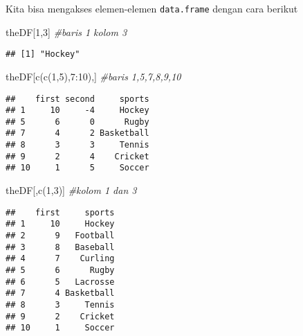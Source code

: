\documentclass[
]{book}
\newenvironment{Shaded}{\begin{snugshade}}{\end{snugshade}}
\newcommand{\CommentTok}[1]{\textcolor[rgb]{0.56,0.35,0.01}{\textit{#1}}}
\newcommand{\DecValTok}[1]{\textcolor[rgb]{0.00,0.00,0.81}{#1}}
\newcommand{\FunctionTok}[1]{\textcolor[rgb]{0.00,0.00,0.00}{#1}}
\newcommand{\NormalTok}[1]{#1}
\newcommand{\SpecialCharTok}[1]{\textcolor[rgb]{0.00,0.00,0.00}{#1}}
\begin{document}
Kita bisa mengakses elemen-elemen \texttt{data.frame} dengan cara berikut

\begin{Shaded}
\begin{Highlighting}[]
\NormalTok{theDF[}\DecValTok{1}\NormalTok{,}\DecValTok{3}\NormalTok{] }\CommentTok{\#baris 1 kolom 3}
\end{Highlighting}
\end{Shaded}

\begin{verbatim}
## [1] "Hockey"
\end{verbatim}

\begin{Shaded}
\begin{Highlighting}[]
\NormalTok{theDF[}\FunctionTok{c}\NormalTok{(}\FunctionTok{c}\NormalTok{(}\DecValTok{1}\NormalTok{,}\DecValTok{5}\NormalTok{),}\DecValTok{7}\SpecialCharTok{:}\DecValTok{10}\NormalTok{),] }\CommentTok{\#baris 1,5,7,8,9,10}
\end{Highlighting}
\end{Shaded}

\begin{verbatim}
##    first second     sports
## 1     10     -4     Hockey
## 5      6      0      Rugby
## 7      4      2 Basketball
## 8      3      3     Tennis
## 9      2      4    Cricket
## 10     1      5     Soccer
\end{verbatim}

\begin{Shaded}
\begin{Highlighting}[]
\NormalTok{theDF[,}\FunctionTok{c}\NormalTok{(}\DecValTok{1}\NormalTok{,}\DecValTok{3}\NormalTok{)] }\CommentTok{\#kolom 1 dan 3}
\end{Highlighting}
\end{Shaded}

\begin{verbatim}
##    first     sports
## 1     10     Hockey
## 2      9   Football
## 3      8   Baseball
## 4      7    Curling
## 5      6      Rugby
## 6      5   Lacrosse
## 7      4 Basketball
## 8      3     Tennis
## 9      2    Cricket
## 10     1     Soccer
\end{verbatim}

\begin{Shaded}
\end{Shaded}
\end{document}

